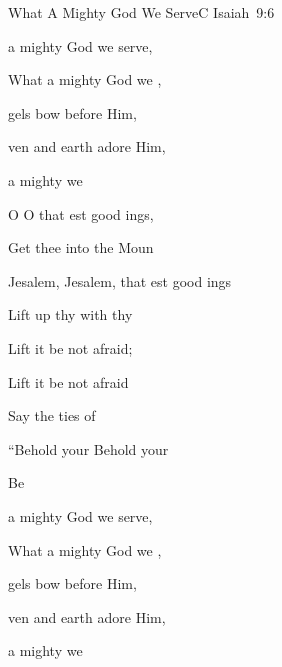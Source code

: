 
\begin{song}{What A Mighty God We Serve}{C}
  {\SBOrgMel}
  {}
  {Isaiah~9:6}
  {\NotCCLIed}

  \renewcommand{\RevDate}{February~11,~1993}

  \begin{SBOpGroup}
     a mighty God we serve,
    
    What a mighty God we ,
    
    gels bow before Him,
    
    ven and earth adore Him,
    
     a mighty  we \Ch{[}{} \Ch{]}{}
  \end{SBOpGroup}

  \begin{SBVerse}
    O  O  that est good ings,

    Get thee  into the  Moun

    Jesalem, Jesalem, that est good ings

    Lift up thy  with  thy 

    Lift it  be not afraid;

    Lift it  be not afraid

    Say  the ties of 

    ``Behold your  Behold your 

    Be  
  \end{SBVerse}

  \begin{SBExtraKeys}{
  \CBPageBrk
  \CSColBrk

    \begin{SBOpGroup}
       a mighty God we serve,
        
      What a mighty God we ,
      
      gels bow before Him,
      
      ven and earth adore Him,
      
       a mighty  we \Ch{[}{} \Ch{]}{}
    \end{SBOpGroup}

}
\end{SBExtraKeys}
\end{song}
